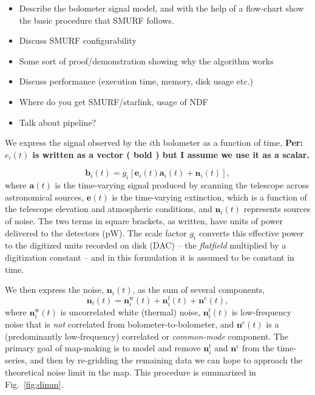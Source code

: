 \documentclass[useAMS,usenatbib,nofootinbib]{mn2e}
\begin{document}
\begin{itemize}

\item Describe the bolometer signal model, and with the help of a flow-chart
show the basic procedure that SMURF follows.

\item Discuss SMURF configurability

\item Some sort of proof/demonstration showing why the algorithm works

\item Discuss performance (execution time, memory, disk usage etc.)

\item Where do you get SMURF/starlink, usage of NDF

\item Talk about pipeline?

\end{itemize}

We express the signal observed by the $i$th bolometer as a function of
 time, \textbf{Per: $e_i(t)$ is written as a vector ( bold ) but I assume
 we use it as a scalar.}

\begin{equation}
\mathbf{b}_i(t) = g_i[\mathbf{e}_i(t) \mathbf{a}_i(t) + \mathbf{n}_i(t)],
\end{equation}
where $\mathbf{a}(t)$ is the time-varying signal produced by scanning
the telescope across astronomical sources, $\mathbf{e}(t)$ is the
time-varying extinction, which is a function of the telescope
elevation and atmospheric conditions, and $\mathbf{n}_i(t)$ represents
sources of noise. The two terms in square brackets, as written, have
units of power delivered to the detectors (pW). The scale factor $g_i$
converts this effective power to the digitized units recorded on disk
(DAC) -- the \emph{flatfield} multiplied by a digitization constant --
and in this formulation it is assumed to be constant in time.

We then express the noise, $\mathbf{n}_i(t)$, as the sum of several
components,
%
\begin{equation}
  \mathbf{n}_i(t) = \mathbf{n}^\mathrm{w}_i(t) + \mathbf{n}^\mathrm{f}_i(t) +
  \mathbf{n}^\mathrm{c}(t),
\label{eq:noise}
\end{equation}
%
where $\mathbf{n}^\mathrm{w}_i(t)$ is uncorrelated white (thermal)
noise, $\mathbf{n}^\mathrm{f}_i(t)$ is low-frequency noise that is
\emph{not} correlated from bolometer-to-bolometer, and
$\mathbf{n}^\mathrm{c}(t)$ is a (predominantly low-frequency)
correlated or \emph{common-mode} component. The primary goal of
map-making is to model and remove $\mathbf{n}^\mathrm{f}_i$ and
$\mathbf{n}^\mathrm{c}$ from the time-series, and then by re-gridding
the remaining data we can hope to approach the theoretical noise limit
in the map. This procedure is summarized in Fig.~\ref{fig:dimm}.
\end{document}

